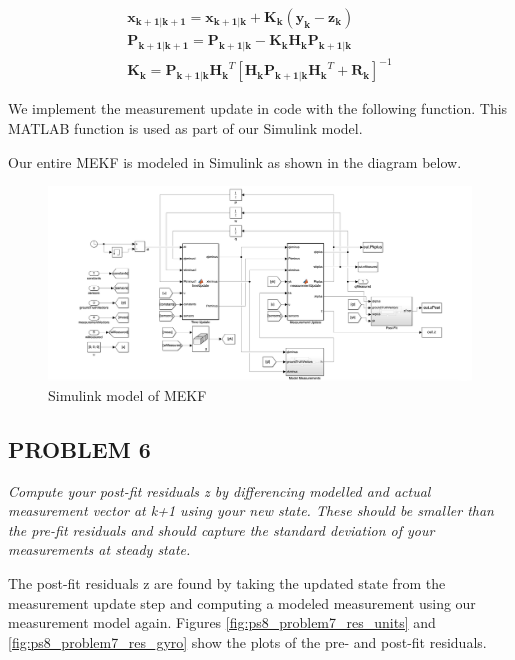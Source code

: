 \begin{align*}
    \mathbf{x_{k+1 | k+1}} = \mathbf{x_{k+1 | k}} + \mathbf{K_k}
    (\mathbf{y_k} - \mathbf{z_k}) \\
    \mathbf{P_{k+1 | k+1}} = \mathbf{P_{k+1 | k}} - 
    \mathbf{K_k} \mathbf{H_k} \mathbf{P_{k+1 | k}} \\
    \mathbf{K_k} = \mathbf{P_{k+1 | k}} \mathbf{H_k}^T [\mathbf{H_k} \mathbf{P_{k+1 | k}} \mathbf{H_k}^T + \mathbf{R_k}]^{-1}
\end{align*}

We implement the measurement update in code with the following function. This MATLAB function is used as part of our Simulink model.



Our entire MEKF is modeled in Simulink as shown in the diagram below.

\begin{figure}[H]
\centering
\includegraphics[scale=0.28]{Images/ps8_problem5_simulink.png}
\caption{Simulink model of MEKF}
\label{fig:ps8_problem5_simulink}
\end{figure}

\subsection{PROBLEM 6}
\textit{Compute your post-fit residuals z by differencing modelled and actual measurement vector at k+1 using your new state. These should be smaller than the pre-fit residuals and should capture the standard deviation of your measurements at steady state.}

The post-fit residuals z are found by taking the updated state from the measurement update step and computing a modeled measurement using our measurement model again. Figures \ref{fig:ps8_problem7_res_units} and \ref{fig:ps8_problem7_res_gyro} show the plots of the pre- and post-fit residuals.

